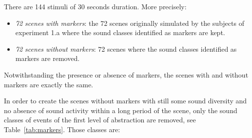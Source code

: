 \documentclass[12pt]{elsarticle}
\newcommand{\ie}{\emph{i.\,e.}}
\newcommand{\cf}{cf.}
\begin{document}


There are 144 stimuli of 30 seconds duration. More precisely:


\begin{itemize}
\item \emph{72 scenes with markers}: the 72 scenes originally simulated by the subjects of experiment 1.a where the sound classes identified as markers are kept.
\item \emph{72 scenes without markers}:  72 scenes where the sound classes identified as markers are removed.
\end{itemize}


Notwithstanding the presence or absence of markers, the scenes with and without markers are exactly the same.


In order to create the scenes without markers with still some sound diversity and no absence of sound activity within a long period of the scene, only the sound classes of events of the first level of abstraction are removed, see Table~\ref{tab:markers}. Those classes are:
\end{document}

